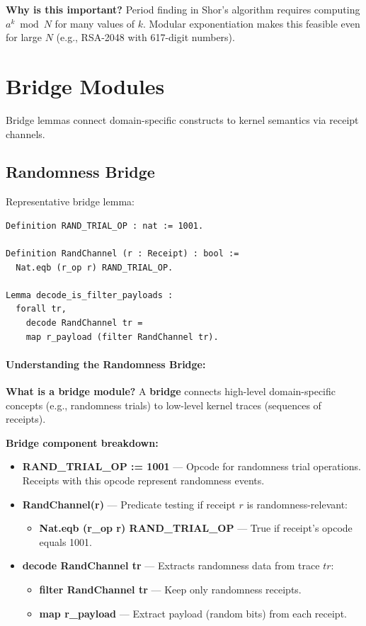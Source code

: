 \textbf{Why is this important?} Period finding in Shor's algorithm requires computing $a^k \bmod N$ for many values of $k$. Modular exponentiation makes this feasible even for large $N$ (e.g., RSA-2048 with 617-digit numbers).



\section{Bridge Modules}

Bridge lemmas connect domain-specific constructs to kernel semantics via receipt channels.

\subsection{Randomness Bridge}

Representative bridge lemma:
\begin{lstlisting}
Definition RAND_TRIAL_OP : nat := 1001.

Definition RandChannel (r : Receipt) : bool :=
  Nat.eqb (r_op r) RAND_TRIAL_OP.

Lemma decode_is_filter_payloads :
  forall tr,
    decode RandChannel tr =
    map r_payload (filter RandChannel tr).
\end{lstlisting}

\paragraph{Understanding the Randomness Bridge:}

\textbf{What is a bridge module?} A \textbf{bridge} connects high-level domain-specific concepts (e.g., randomness trials) to low-level kernel traces (sequences of receipts).

\textbf{Bridge component breakdown:}
\begin{itemize}
    \item \textbf{RAND\_TRIAL\_OP := 1001} — Opcode for randomness trial operations. Receipts with this opcode represent randomness events.
    
    \item \textbf{RandChannel(r)} — Predicate testing if receipt $r$ is randomness-relevant:
    \begin{itemize}
        \item \textbf{Nat.eqb (r\_op r) RAND\_TRIAL\_OP} — True if receipt's opcode equals 1001.
    \end{itemize}
    
    \item \textbf{decode RandChannel tr} — Extracts randomness data from trace $tr$:
    \begin{itemize}
        \item \textbf{filter RandChannel tr} — Keep only randomness receipts.
        \item \textbf{map r\_payload} — Extract payload (random bits) from each receipt.
    \end{itemize}
\end{itemize}

